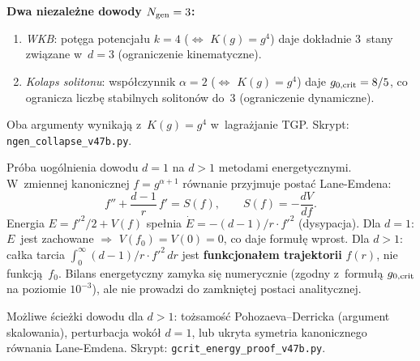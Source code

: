 \begin{proposition}[Pr\'og kolapsu solitonu i~$N_{\rm gen} = 3$]
\medskip\noindent
\textbf{Dwa niezale\.zne dowody $N_{\rm gen} = 3$:}
\begin{enumerate}[nosep]
  \item \emph{WKB}: pot\k{e}ga potencja\l{}u $k = 4$
    ($\Leftrightarrow$ $K(g) = g^4$) daje dok\l{}adnie 3~stany
    zwi\k{a}zane w~$d = 3$ (ograniczenie kinematyczne).
  \item \emph{Kolaps solitonu}: wsp\'o\l{}czynnik
    $\alpha = 2$ ($\Leftrightarrow$ $K(g) = g^4$)
    daje $g_{0,\rm crit} = 8/5$, co ogranicza
    liczb\k{e} stabilnych soliton\'ow do~3 (ograniczenie dynamiczne).
\end{enumerate}
Oba argumenty wynikaj\k{a} z~$K(g) = g^4$ w~lagra\.zjanie TGP.
Skrypt: \texttt{ngen\_collapse\_v47b.py}.
\end{proposition}

\begin{remark}%
\label{rem:T-energy-dissipation}
Pr\'oba uog\'olnienia dowodu $d = 1$ na $d > 1$ metodami energetycznymi.
W~zmiennej kanonicznej $f = g^{\alpha+1}$ r\'ownanie przyjmuje posta\'c
Lane-Emdena:
\[
  f'' + \frac{d{-}1}{r}\,f' = S(f),
  \qquad S(f) = -\frac{dV}{df}.
\]
Energia $E = f'^2/2 + V(f)$ spe\l{}nia
$\dot{E} = -(d{-}1)/r \cdot f'^2$ (dysypacja).
Dla $d = 1$: $E$~jest zachowane $\Rightarrow$ $V(f_0) = V(0) = 0$,
co daje formu\l{}\k{e} wprost.
Dla $d > 1$: ca\l{}ka tarcia
$\int_0^\infty (d{-}1)/r \cdot f'^2\,dr$
jest \textbf{funkcjona\l{}em trajektorii} $f(r)$, nie funkcj\k{a}~$f_0$.
Bilans energetyczny zamyka si\k{e} numerycznie (zgodny z~formu\l{}\k{a}
$g_{0,\rm crit}$ na poziomie $10^{-3}$), ale nie prowadzi do zamkni\k{e}tej postaci
analitycznej.

\medskip\noindent
Mo\.zliwe \'scie\.zki dowodu dla $d > 1$:
to\.zsamo\'s\'c Pohozaeva--Derricka (argument skalowania),
perturbacja wok\'o\l{} $d = 1$,
lub ukryta symetria kanonicznego r\'ownania Lane-Emdena.
Skrypt: \texttt{gcrit\_energy\_proof\_v47b.py}.
\end{remark}

